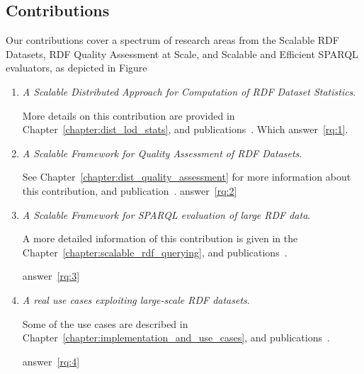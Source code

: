 \subsection{Contributions}
Our contributions cover a spectrum of research areas from the Scalable RDF Datasets, RDF Quality Assessment at Scale, and Scalable and Efficient SPARQL evaluators, as depicted in Figure~

\begin{enumerate}
    \item \textit{A Scalable Distributed Approach for Computation of RDF Dataset Statistics}.
    
    More details on this contribution are provided in Chapter~\ref{chapter:dist_lod_stats}, and publications~\cite{sejdiu-2018-dist-lod-stats-iswc, sejdiu-2018-statisfy-iswc-poster}.
    Which answer~\ref{rq:1}.
    
    \item \textit{A Scalable Framework for Quality Assessment of RDF Datasets}.
    
    See Chapter~\ref{chapter:dist_quality_assessment} for more information about this contribution, and publication~\cite{sejdiu-2019-sansa-dist-quality-assessment-iswc}.
    answer~\ref{rq:2}
    
    \item \textit{A Scalable Framework for SPARQL evaluation of large RDF data}.
    
    A more detailed information of this contribution is given in the Chapter~\ref{chapter:scalable_rdf_querying}, and publications~\cite{2019-sansa-sparklify-iswc, sejdiu-2019-sansa-semantic-based-semantics, sansa-sparklify-ISWC-demo}.
    
    answer~\ref{rq:3}
    
    \item \textit{A real use cases exploiting large-scale RDF datasets}.
    
    Some of the use cases are described in Chapter~\ref{chapter:implementation_and_use_cases}, and publications~\cite{lehmann-2017-sansa-iswc, iermilov-2017-sansa-iswc-demo, sansa-hubs-and-authorities-transaction-semantics19-poster, piping-clustering-eswc19-poster, graux-2018-sansa-ethereum-semantics-poster, Auer+ICWE-2017}.
    
    answer~\ref{rq:4}
    
\end{enumerate}


